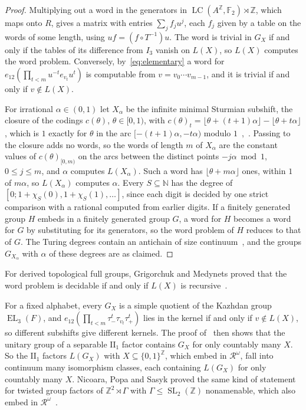 \documentclass[11pt]{amsart}
\newcommand{\F}{\mathbb F}
\newcommand{\Z}{\mathbb Z}
\newcommand{\LC}{\operatorname{LC}}
\newcommand{\EL}{\operatorname{EL}}
\newcommand{\SL}{\operatorname{SL}}
\begin{document}
\begin{proof}
Multiplying out a word in the generators in $\LC(A^{\Z},\F_2)\rtimes\Z$,
which maps onto $R$, gives a matrix with entries $\sum_jf_ju^j$, each
$f_j$ given by a table on the words of some length, using
$uf=(f\circ T^{-1})u$. The word is trivial in $G_X$ if and only if the
tables of its difference from $I_3$ vanish on $L(X)$, so $L(X)$ computes
the word problem. Conversely, by~\eqref{eq:elementary} a word for
$e_{12}(\prod_{t<m}u^{-t}e_{v_t}u^t)$ is computable from
$v=v_0\cdots v_{m-1}$, and it is trivial if and only if $v\notin L(X)$.

For irrational $\alpha\in(0,1)$ let $X_\alpha$ be the infinite minimal
Sturmian subshift, the closure of the codings $c(\theta)$,
$\theta\in[0,1)$, with
$c(\theta)_t=\lfloor\theta+(t+1)\alpha\rfloor-\lfloor\theta+t\alpha\rfloor$,
which is $1$ exactly for $\theta$ in the arc $[-(t+1)\alpha,-t\alpha)$
modulo $1$~\cite{MorseHedlund,Hedlund44},~\cite[Chapter~2]{Lothaire}.
Passing to the closure adds no words, so the words of length $m$ of
$X_\alpha$ are the constant values of $c(\theta)_{[0,m)}$ on the arcs
between the distinct points $-j\alpha\bmod1$, $0\le j\le m$, and $\alpha$
computes $L(X_\alpha)$. Such a word has $\lfloor\theta+m\alpha\rfloor$
ones, within $1$ of $m\alpha$, so $L(X_\alpha)$ computes $\alpha$. Every
$S\subseteq\mathbb N$ has the degree of
$[0;1+\chi_S(0),1+\chi_S(1),\dots]$, since each digit is decided by one
strict comparison with a rational computed from earlier digits. If a
finitely generated group $H$ embeds in a finitely generated group $G$, a
word for $H$ becomes a word for $G$ by substituting for its generators,
so the word problem of $H$ reduces to that of $G$. The Turing degrees
contain an antichain of size continuum~\cite[Chapter~V]{Odifreddi}, and
the groups $G_{X_\alpha}$ with $\alpha$ of these degrees are as claimed.
\end{proof}

For derived topological full groups, Grigorchuk and Medynets proved that
the word problem is decidable if and only if $L(X)$ is
recursive~\cite[Theorem~1.1(3)]{GMpres}.

For a fixed alphabet, every $G_X$ is a simple quotient of the Kazhdan group
$\EL_3(F)$, and $e_{12}(\prod_{t<m}\tau_-^t\tau_{v_t}\tau_+^t)$ lies in
the kernel if and only if $v\notin L(X)$, so different subshifts give
different kernels. The proof of~\cite[Theorem~2]{OzawaUniversal} then
shows that the unitary group of a separable $\mathrm{II}_1$ factor
contains $G_X$ for only countably many $X$. So the $\mathrm{II}_1$
factors $L(G_X)$ with $X\subseteq\{0,1\}^{\Z}$, which embed in
$\mathcal R^\omega$, fall into continuum many isomorphism classes, each
containing $L(G_X)$ for only countably many $X$. Nicoara, Popa and Sasyk
proved the same kind of statement for twisted group factors of
$\Z^2\rtimes\Gamma$ with $\Gamma\le\SL_2(\Z)$ nonamenable, which also
embed in $\mathcal R^\omega$~\cite[Theorem~0.1]{NPS}.
\end{document}
